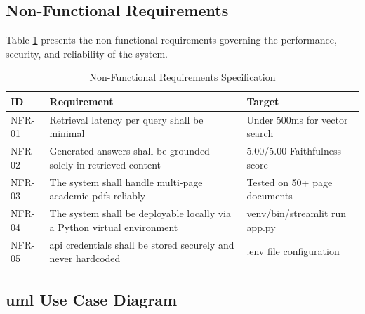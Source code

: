 \subsection{Non-Functional Requirements}

Table \ref{tab:nfr} presents the non-functional requirements governing the performance, security, and reliability of the system.

\begin{table}[H]

\centering

\caption{Non-Functional Requirements Specification}

\label{tab:nfr}

\begin{tabular}{|p{1.2cm}|p{8cm}|p{3.5cm}|}

\hline

\textbf{ID} & \textbf{Requirement} & \textbf{Target} \\

\hline

NFR-01 & Retrieval latency per query shall be minimal & Under 500ms for vector search \\

\hline

NFR-02 & Generated answers shall be grounded solely in retrieved content & 5.00/5.00 Faithfulness score \\

\hline

NFR-03 & The system shall handle multi-page academic \gls{pdf}s reliably & Tested on 50+ page documents \\

\hline

NFR-04 & The system shall be deployable locally via a Python virtual environment & venv/bin/streamlit run app.py \\

\hline

NFR-05 & \gls{api} credentials shall be stored securely and never hardcoded & .env file configuration \\

\hline

\end{tabular}

\end{table}

\subsection{\gls{uml} Use Case Diagram}


